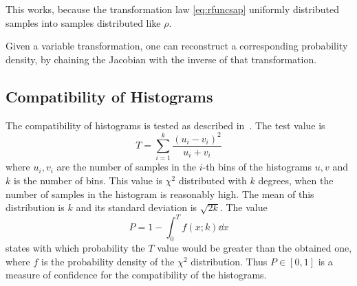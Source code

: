 This works, because the transformation law \cref{eq:rfuncsap}
uniformly distributed samples into samples distributed like \(\rho\).

Given a variable transformation, one can reconstruct a corresponding
probability density, by chaining the Jacobian with the inverse of that
transformation.

\subsection{Compatibility of Histograms}
\label{sec:comphist}

The compatibility of histograms is tested as described
in~\cite{porter2008:te}. The test value
is \[T=\sum_{i=1}^k\frac{(u_i-v_i)^2}{u_i+v_i}\] where \(u_i, v_i\)
are the number of samples in the \(i\)-th bins of the histograms
\(u,v\) and \(k\) is the number of bins. This value is \(\chi^2\)
distributed with \(k\) degrees, when the number of samples in the
histogram is reasonably high. The mean of this distribution is \(k\)
and its standard deviation is \(\sqrt{2k}\). The value
\[P = 1 - \int_0^{T}f(x;k)\dd{x}\] states with which probability the
\(T\) value would be greater than the obtained one, where \(f\) is the
probability density of the \(\chi^2\) distribution. Thus
\(P\in [0,1]\) is a measure of confidence for the compatibility of the
histograms.

